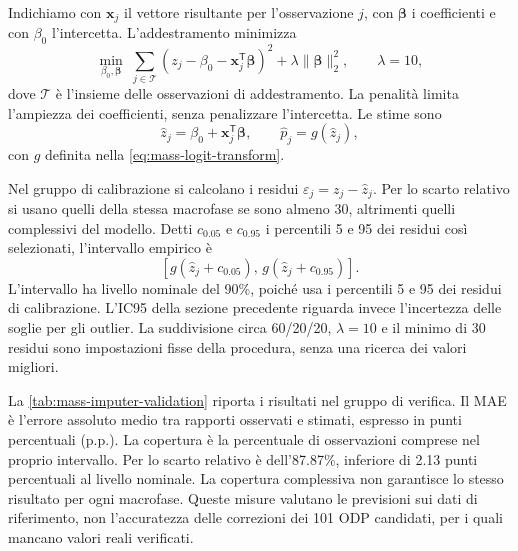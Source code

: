 Indichiamo con $\bm{x}_j$ il vettore risultante per l'osservazione $j$, con $\bm{\beta}$ i coefficienti e con $\beta_0$ l'intercetta. L'addestramento minimizza
\begin{equation}
\label{eq:mass-ridge-objective}
\min_{\beta_0,\bm{\beta}}\;
\sum_{j\in\mathcal{T}}\left(z_j-\beta_0-\bm{x}_j^{\mathsf{T}}\bm{\beta}\right)^2
+\lambda\lVert\bm{\beta}\rVert_2^2,
\qquad \lambda=10,
\end{equation}
dove $\mathcal{T}$ è l'insieme delle osservazioni di addestramento. La penalità limita l'ampiezza dei coefficienti, senza penalizzare l'intercetta. Le stime sono
\begin{equation}
\label{eq:mass-ridge-estimation}
\widehat{z}_j=\beta_0+\bm{x}_j^{\mathsf{T}}\bm{\beta},
\qquad
\widehat{p}_j=g(\widehat{z}_j),
\end{equation}
con $g$ definita nella \cref{eq:mass-logit-transform}.

Nel gruppo di calibrazione si calcolano i residui $\varepsilon_j=z_j-\widehat{z}_j$. Per lo scarto relativo si usano quelli della stessa macrofase se sono almeno 30, altrimenti quelli complessivi del modello. Detti $c_{0.05}$ e $c_{0.95}$ i percentili 5 e 95 dei residui così selezionati, l'intervallo empirico è
\begin{equation}
\label{eq:mass-ratio-interval}
\left[g\left(\widehat{z}_j+c_{0.05}\right),\,
      g\left(\widehat{z}_j+c_{0.95}\right)\right].
\end{equation}
L'intervallo ha livello nominale del 90\%, poiché usa i percentili 5 e 95 dei residui di calibrazione. L'IC95 della sezione precedente riguarda invece l'incertezza delle soglie per gli outlier. La suddivisione circa 60/20/20, $\lambda=10$ e il minimo di 30 residui sono impostazioni fisse della procedura, senza una ricerca dei valori migliori.

La \cref{tab:mass-imputer-validation} riporta i risultati nel gruppo di verifica. Il MAE è l'errore assoluto medio tra rapporti osservati e stimati, espresso in punti percentuali (p.p.). La copertura è la percentuale di osservazioni comprese nel proprio intervallo. Per lo scarto relativo è dell'\num{87.87}\%, inferiore di \num{2.13} punti percentuali al livello nominale. La copertura complessiva non garantisce lo stesso risultato per ogni macrofase. Queste misure valutano le previsioni sui dati di riferimento, non l'accuratezza delle correzioni dei 101 ODP candidati, per i quali mancano valori reali verificati.



